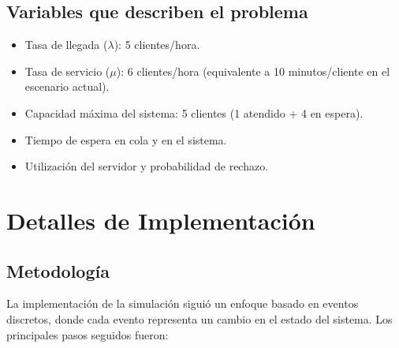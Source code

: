 \documentclass[12pt,a4paper]{article}
\begin{document}
\subsection{Variables que describen el problema}

\begin{itemize}
    \item Tasa de llegada ($\lambda$): 5 clientes/hora.
    \item Tasa de servicio ($\mu$): 6 clientes/hora (equivalente a 10 minutos/cliente en el escenario actual).
    \item Capacidad máxima del sistema: 5 clientes (1 atendido + 4 en espera).
    \item Tiempo de espera en cola y en el sistema.
    \item Utilización del servidor y probabilidad de rechazo.
\end{itemize}

\section{Detalles de Implementación}

\subsection{Metodología}
La implementación de la simulación siguió un enfoque basado en eventos discretos, donde cada evento representa un cambio en el estado del sistema. Los principales pasos seguidos fueron:
\end{document}
